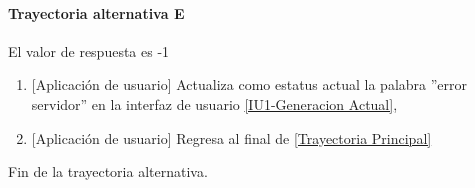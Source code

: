 \paragraph{Trayectoria alternativa E} \label{SUB-U-CU1.13:TE}
	El valor de respuesta es -1
	\begin{enumerate}[label=E\arabic*.]
		\item {[Aplicación de usuario]} Actualiza como estatus actual la palabra ''error servidor'' en la interfaz de usuario \hyperref[fig:monitoreo]{[IU1-Generacion Actual]},
		\item {[Aplicación de usuario]} Regresa al final de \hyperref[SUB-U-CU1.13:TP]{[Trayectoria Principal]}
	\end{enumerate}
	Fin de la trayectoria alternativa.
